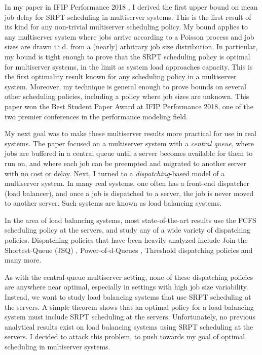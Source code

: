 \documentclass[11pt]{article}
\begin{document}
In my paper in IFIP Performance 2018 \cite{GROSOF2018154},
I derived the first upper bound on mean job delay for SRPT scheduling in multiserver systems.
This is the first result of its kind for any non-trivial multiserver scheduling policy.
My bound applies to any multiserver system
where jobs arrive according to a Poisson process
and job sizes are drawn i.i.d. from a (nearly) arbitrary job size distribution.
In particular, my bound is tight enough to prove that the SRPT scheduling policy
is optimal for multiserver systems,
in the limit as system load approaches capacity.
This is the first optimality result known for any scheduling policy in a multiserver system.
Moreover, my technique is general enough to prove bounds on several other scheduling policies,
including a policy where job sizes are unknown.
This paper won the Best Student Paper Award at IFIP Performance 2018,
one of the two premier conferences in the performance modeling field.

My next goal was to make these multiserver results more practical for use in real systems.
The \cite{GROSOF2018154} paper focused on a multiserver system with a \textit{central queue},
where jobs are buffered in a central queue until a server becomes available for them to run on,
and where each job can be preempted and migrated to another server with no cost or delay.
Next, I turned to a \textit{dispatching}-based model of a multiserver system.
In many real systems, one often has a front-end dispatcher (load balancer),
and once a job is dispatched to a server,
the job is never moved to another server.
Such systems are known as load balancing systems.

In the area of load balancing systems,
most state-of-the-art results use the FCFS scheduling policy at the servers,
and study any of a wide variety of dispatching policies.
Dispatching policies that have been heavily analyzed include Join-the-Shortest-Queue (JSQ)
\cite{doi:10.1287/moor.2017.0887} \cite{doi:10.1287/opre.34.1.55} \cite{491583},
Power-of-d-Queues
\cite{Bramson:2010:RLB:1811099.1811071} \cite{vvedenskaya1996queueing} \cite{963420},
Threshold dispatching policies
\cite{Teh2002} \cite{Zhou:2017:DLH:3175501.3154498}
and many more.

As with the central-queue multiserver setting,
none of these dispatching policies are anywhere near optimal,
especially in settings with high job size variability.
Instead, we want to study load balancing systems that use SRPT scheduling at the servers.
A simple theorem \cite{Grosof:2019:LBG:3341617.3326157}
shows that an optimal policy for a load balancing system
must include SRPT scheduling at the servers.
Unfortunately, no previous analytical results exist
on load balancing systems using SRPT scheduling at the servers.
I decided to attack this problem,
to push towards my goal of optimal scheduling in multiserver systems.
\end{document}
